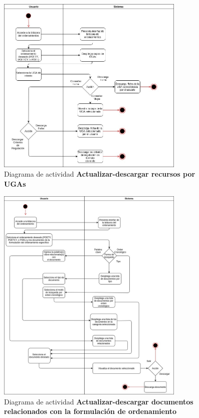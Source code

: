 \pagebreak
\begin{figure}[h]
\centering
\caption{Diagrama de actividad \textbf{Actualizar-descargar recursos por UGAs}}\label{fig:priorReq}
\includegraphics[width=0.8\textwidth, height=.5\textwidth]{images/diag_act_consultardescargar_UGAs}
\end{figure}

\pagebreak
\begin{figure}[h]
\centering
\caption{Diagrama de actividad \textbf{Actualizar-descargar documentos relacionados con la formulación de ordenamiento}}\label{fig:priorReq}
\includegraphics[width=0.8\textwidth, height=.6\textwidth]{images/diag_act_consultardescargar_doc_relac_form}
\end{figure}


